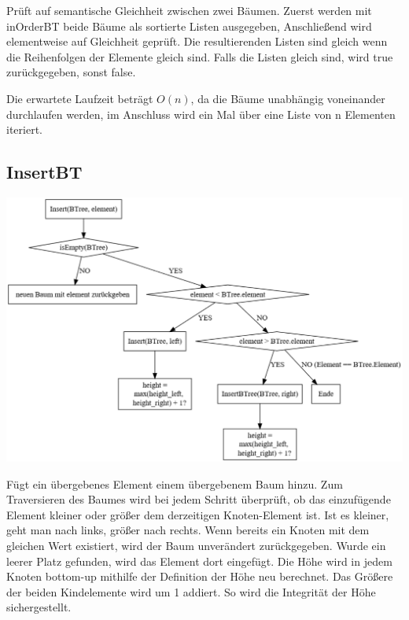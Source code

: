 \documentclass[11pt]{article}
\begin{document}
    Prüft auf semantische Gleichheit zwischen zwei Bäumen.
    Zuerst werden mit inOrderBT beide Bäume als sortierte Listen ausgegeben,
    Anschließend wird elementweise auf Gleichheit geprüft.
    Die resultierenden Listen sind gleich wenn die Reihenfolgen der Elemente gleich sind.
    Falls die Listen gleich sind, wird true zurückgegeben, sonst false.

    Die erwartete Laufzeit beträgt
    \begin{math}
        O(n)
    \end{math},
    da die Bäume unabhängig voneinander durchlaufen werden, im Anschluss wird
    ein Mal über eine Liste von n Elementen iteriert.

    \subsection{InsertBT}\label{subsec:insertbt}

    \begin{center}
        \includegraphics[width=1.2\columnwidth] {insert.pdf}
    \end{center}

    Fügt ein übergebenes Element einem übergebenem Baum hinzu.
    Zum Traversieren des Baumes wird bei jedem Schritt überprüft,
    ob das einzufügende Element kleiner oder größer dem derzeitigen Knoten-Element ist.
    Ist es kleiner, geht man nach links, größer nach rechts.
    Wenn bereits ein Knoten mit dem gleichen Wert existiert, wird der Baum
    unverändert zurückgegeben.
    Wurde ein leerer Platz gefunden, wird das Element dort eingefügt.
    Die Höhe wird in jedem Knoten bottom-up mithilfe der Definition der Höhe neu berechnet. Das Größere der beiden Kindelemente wird um 1 addiert. So wird die Integrität der Höhe sichergestellt.
\end{document}
